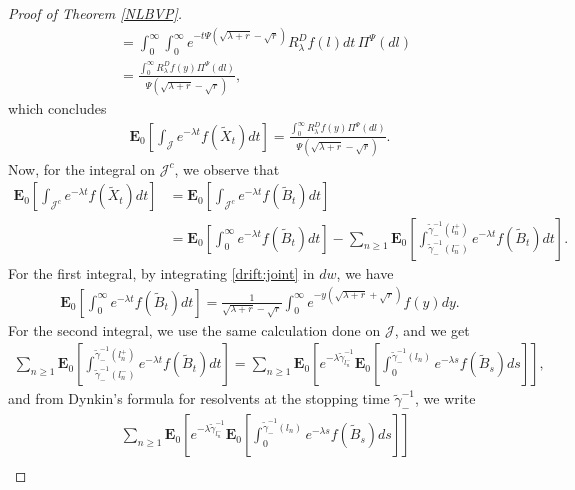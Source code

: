 \documentclass[11pt,a4paper]{article}
\theoremstyle{definition}
\theoremstyle{remark}
\begin{document}
\begin{proof}[Proof of Theorem \ref{NLBVP}]
\begin{align*}
		&=\int_0^\infty \int_0^\infty e^{-t \Psi(\sqrt{\lambda+r}-\sqrt{r})} {R}_\lambda^D f( l) dt \,\Pi^\Psi(dl)\\
		&=\frac{\int_0^\infty {R}_\lambda^D f(y) \Pi^\Psi(dl)}{\Psi(\sqrt{\lambda+r}-\sqrt{r})},
	\end{align*}
	which concludes
	\begin{align}
		\label{resolvent:jumps}
		\mathbf{E}_{0}  \left[\int_{\mathcal{J}} e^{-\lambda t} f(\widetilde{X}_t) dt\right]=\frac{\int_0^\infty {R}_\lambda^D f(y) \Pi^\Psi(dl)}{\Psi(\sqrt{\lambda+r}-\sqrt{r})}.
	\end{align}
	Now, for the integral on \(\mathcal{J}^c\), we observe that 
	\begin{align*}
		\mathbf{E}_{0}  \left[\int_{\mathcal{J}^c} e^{-\lambda t} f(\widetilde{X}_t) dt\right]&=\mathbf{E}_{0}  \left[\int_{\mathcal{J}^c} e^{-\lambda t} f(\widetilde{B}_t) dt\right] \\
		&=\mathbf{E}_{0}  \left[\int_0^\infty e^{-\lambda t} f(\widetilde{B}_t) dt\right]-\sum_{n \geq 1} \mathbf{E}_{0}  \left[\int_{\widetilde{\gamma}_{-}^{-1}(l_n^-)}^{\widetilde{\gamma}_{-}^{-1}(l_n^+)} e^{-\lambda t} f(\widetilde{B}_t) dt\right].
	\end{align*}
	For the first integral, by integrating \eqref{drift:joint} in \(dw\), we have
	\begin{align*}
		\mathbf{E}_{0}  \left[\int_0^\infty e^{-\lambda t} f(\widetilde{B}_t) dt\right]= \frac{1 }{\sqrt{\lambda + r} - \sqrt{r}} \int_0^\infty e^{-y(\sqrt{\lambda + r} + \sqrt{r}) } f(y) dy.
	\end{align*}
	For the second integral, we use the same calculation done on \(\mathcal{J}\), and we get
	\begin{align*}
		\sum_{n \geq 1} \mathbf{E}_{0}  \left[\int_{\widetilde{\gamma}_{-}^{-1}(l_n^-)}^{\widetilde{\gamma}_{-}^{-1}(l_n^+)} e^{-\lambda t} f(\widetilde{B}_t) dt\right]=\sum_{n \geq 1} \mathbf{E}_{0}\left[e^{-\lambda \widetilde{\gamma}^{-1}_{l_n^-}} \mathbf{E}_{0} \left[\int_0^{\widetilde{\gamma}_{-}^{-1}(l_n)} e^{-\lambda s } f(\widetilde{B}_s) ds \right] \right], 
	\end{align*}
	and from Dynkin's formula for resolvents at the stopping time \(\widetilde{\gamma}_{-}^{-1}\), we write
	\begin{align*}
		&\sum_{n \geq 1} \mathbf{E}_{0}\left[e^{-\lambda \widetilde{\gamma}^{-1}_{l_n^-}} \mathbf{E}_{0} \left[\int_0^{\widetilde{\gamma}_{-}^{-1}(l_n)} e^{-\lambda s } f(\widetilde{B}_s) ds \right] \right]\\

\end{align*}
\end{proof}
\end{document}
